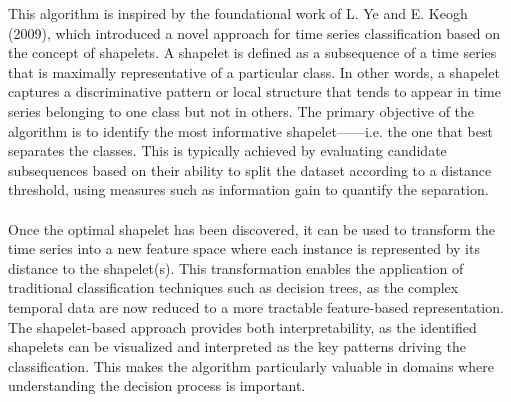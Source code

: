 This algorithm is inspired by the foundational work of L. Ye and E. Keogh (2009), which introduced a novel approach for time series classification based on the concept of shapelets. A shapelet is defined as a subsequence of a time series that is maximally representative of a particular class. In other words, a shapelet captures a discriminative pattern or local structure that tends to appear in time series belonging to one class but not in others. The primary objective of the algorithm is to identify the most informative shapelet——i.e. the one that best separates the classes. This is typically achieved by evaluating candidate subsequences based on their ability to split the dataset according to a distance threshold, using measures such as information gain to quantify the separation.\\
\\
Once the optimal shapelet has been discovered, it can be used to transform the time series into a new feature space where each instance is represented by its distance to the shapelet(s). This transformation enables the application of traditional classification techniques such as decision trees, as the complex temporal data are now reduced to a more tractable feature-based representation. The shapelet-based approach provides both interpretability, as the identified shapelets can be visualized and interpreted as the key patterns driving the classification. This makes the algorithm particularly valuable in domains where understanding the decision process is important.\\

